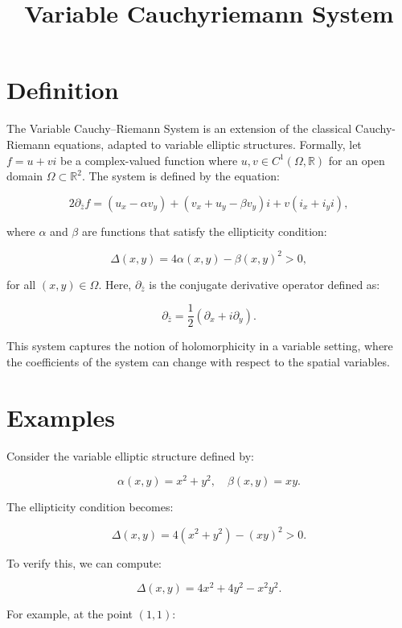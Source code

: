 \documentclass[11pt,a4paper]{article}
\title{Variable Cauchyriemann System}
\date{}
\begin{document}
\maketitle
\section{Definition}
The Variable Cauchy–Riemann System is an extension of the classical Cauchy-Riemann equations, adapted to variable elliptic structures. Formally, let $f = u + vi$ be a complex-valued function where $u, v \in C^1(\Omega, \mathbb{R})$ for an open domain $\Omega \subset \mathbb{R}^2$. The system is defined by the equation:

\begin{equation}
2 \partial_{\bar{z}} f = (u_x - \alpha v_y) + (v_x + u_y - \beta v_y)i + v (i_x + i_y i),
\end{equation}

where $\alpha$ and $\beta$ are functions that satisfy the ellipticity condition:

\begin{equation}
\Delta(x, y) = 4\alpha(x, y) - \beta(x, y)^2 > 0,
\end{equation}

for all $(x, y) \in \Omega$. Here, $\partial_{\bar{z}}$ is the conjugate derivative operator defined as:

\begin{equation}
\partial_{\bar{z}} = \frac{1}{2} \left( \partial_x + i \partial_y \right).
\end{equation}

This system captures the notion of holomorphicity in a variable setting, where the coefficients of the system can change with respect to the spatial variables.

\section{Examples}
Consider the variable elliptic structure defined by:

\[
\alpha(x, y) = x^2 + y^2, \quad \beta(x, y) = xy.
\]

The ellipticity condition becomes:

\[
\Delta(x, y) = 4(x^2 + y^2) - (xy)^2 > 0.
\]

To verify this, we can compute:

\[
\Delta(x, y) = 4x^2 + 4y^2 - x^2y^2.
\]

For example, at the point $(1, 1)$:
\end{document}
